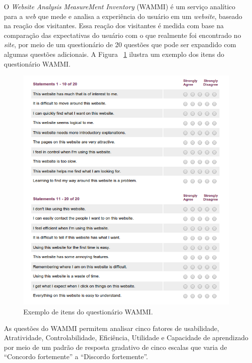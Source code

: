       \nocite{wammi}
      O \textit{Website Analysis MeasureMent Inventory} (WAMMI) é um serviço analítico para a \textit{web} que mede e analisa a experiência do
      usuário em um \textit{website}, baseado na reação dos visitantes. Essa reação dos visitantes é medida com base na comparação das
      expectativas do usuário com o que realmente foi encontrado no \textit{site}, por meio de um questionário de 20 questões que pode
      ser expandido com algumas questões adicionais. A Figura ~\ref{wammi_questions} ilustra um exemplo dos itens do questionário WAMMI.
      
      \begin{figure}[!htpb]
	\centering
	\includegraphics[scale=0.67]{editaveis/figuras/wammi_questions}
	\caption[Exemplo de itens do questionário WAMMI]{Exemplo de itens do questionário WAMMI. \footnotemark}
	\label{wammi_questions}
      \end{figure}
      
      As questões do WAMMI permitem analisar cinco fatores de usabilidade, Atratividade, Controlabilidade, Eficiência, Utilidade
      e Capacidade de aprendizado por meio de um padrão de resposta gradativo de cinco escalas que varia de “Concordo fortemente”
      a “Discordo fortemente”.
      

